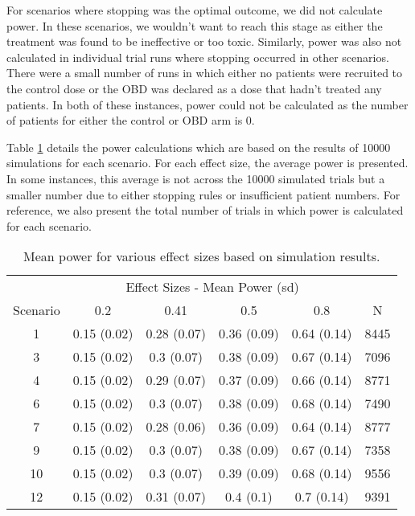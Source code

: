 For scenarios where stopping was the optimal outcome, we did not calculate power. In these scenarios, we wouldn't want to reach this stage as either the treatment was found to be ineffective or too toxic. Similarly, power was also not calculated in individual trial runs where stopping occurred in other scenarios. There were a small number of runs in which either no patients were recruited to the control dose or the OBD was declared as a dose that hadn't treated any patients. In both of these instances, power could not be calculated as the number of patients for either the control or OBD arm is 0. 
 
Table \ref{tab_wt:Power-Calcs} details the power calculations which are based on the results of 10000 simulations for each scenario. For each effect size, the average power is presented. In some instances, this average is not across the 10000 simulated trials but a smaller number due to either stopping rules or insufficient patient numbers. For reference, we also present the total number of trials in which power is calculated for each scenario. 

\begin{table}[h!]
	
	\caption{\label{tab_wt:Power-Calcs}Mean power for various effect sizes based on simulation results.}
	\centering
	\begin{tabular}[t]{cccccc}
		\toprule
		\multicolumn{1}{c}{ } & \multicolumn{4}{c}{Effect Sizes - Mean Power (sd)} & \multicolumn{1}{c}{ } \\
		\cmidrule(l{3pt}r{3pt}){2-5}
		Scenario & 0.2 & 0.41 & 0.5 & 0.8 & N\\
		\midrule
		1 & 0.15 (0.02) & 0.28 (0.07) & 0.36 (0.09) & 0.64 (0.14) & 8445\\
		3 & 0.15 (0.02) & 0.3 (0.07) & 0.38 (0.09) & 0.67 (0.14) & 7096\\
		4 & 0.15 (0.02) & 0.29 (0.07) & 0.37 (0.09) & 0.66 (0.14) & 8771\\
		6 & 0.15 (0.02) & 0.3 (0.07) & 0.38 (0.09) & 0.68 (0.14) & 7490\\
		7 & 0.15 (0.02) & 0.28 (0.06) & 0.36 (0.09) & 0.64 (0.14) & 8777\\
		9 & 0.15 (0.02) & 0.3 (0.07) & 0.38 (0.09) & 0.67 (0.14) & 7358\\
		10 & 0.15 (0.02) & 0.3 (0.07) & 0.39 (0.09) & 0.68 (0.14) & 9556\\
		12 & 0.15 (0.02) & 0.31 (0.07) & 0.4 (0.1) & 0.7 (0.14) & 9391\\
		\bottomrule
	\end{tabular}
\end{table}

